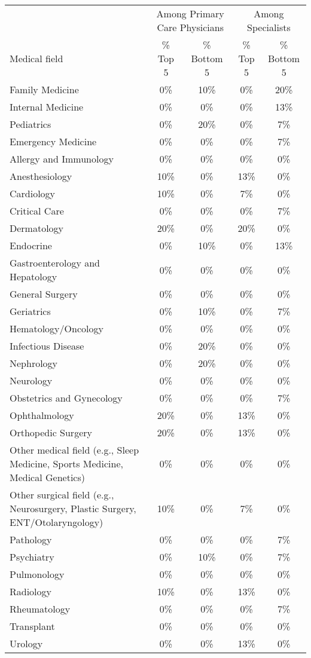 \begin{tabular}{lcccc}\toprule
 & \multicolumn{2}{c}{Among Primary Care Physicians} & \multicolumn{2}{c}{Among Specialists} \\
\cmidrule(lr){2-3} \cmidrule(lr){4-5}
Medical field & \% Top 5 & \% Bottom 5 & \% Top 5 & \% Bottom 5 \\ \midrule
Family Medicine & 0\% & 10\% & 0\% & 20\% \\
Internal Medicine & 0\% & 0\% & 0\% & 13\% \\
Pediatrics & 0\% & 20\% & 0\% & 7\% \\
\midrule
Emergency Medicine & 0\% & 0\% & 0\% & 7\% \\
\midrule
Allergy and Immunology & 0\% & 0\% & 0\% & 0\% \\
Anesthesiology & 10\% & 0\% & 13\% & 0\% \\
Cardiology & 10\% & 0\% & 7\% & 0\% \\
Critical Care & 0\% & 0\% & 0\% & 7\% \\
Dermatology & 20\% & 0\% & 20\% & 0\% \\
Endocrine & 0\% & 10\% & 0\% & 13\% \\
Gastroenterology and Hepatology & 0\% & 0\% & 0\% & 0\% \\
General Surgery & 0\% & 0\% & 0\% & 0\% \\
Geriatrics & 0\% & 10\% & 0\% & 7\% \\
Hematology/Oncology & 0\% & 0\% & 0\% & 0\% \\
Infectious Disease & 0\% & 20\% & 0\% & 0\% \\
Nephrology & 0\% & 20\% & 0\% & 0\% \\
Neurology & 0\% & 0\% & 0\% & 0\% \\
Obstetrics and Gynecology & 0\% & 0\% & 0\% & 7\% \\
Ophthalmology & 20\% & 0\% & 13\% & 0\% \\
Orthopedic Surgery & 20\% & 0\% & 13\% & 0\% \\
Other medical field (e.g., Sleep Medicine, Sports Medicine, Medical Genetics) & 0\% & 0\% & 0\% & 0\% \\
Other surgical field (e.g., Neurosurgery, Plastic Surgery, ENT/Otolaryngology) & 10\% & 0\% & 7\% & 0\% \\
Pathology & 0\% & 0\% & 0\% & 7\% \\
Psychiatry & 0\% & 10\% & 0\% & 7\% \\
Pulmonology & 0\% & 0\% & 0\% & 0\% \\
Radiology & 10\% & 0\% & 13\% & 0\% \\
Rheumatology & 0\% & 0\% & 0\% & 7\% \\
Transplant & 0\% & 0\% & 0\% & 0\% \\
Urology & 0\% & 0\% & 13\% & 0\% \\
\bottomrule\end{tabular}
